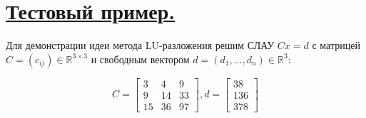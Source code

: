 \documentclass[a4paper, 12pt]{article}
\begin{document}
	\section{\underline{Тестовый пример.}}
	
	Для демонстрации идеи метода LU-разложения решим СЛАУ $Cx=d$ с матрицей $C=(c_{ij})\in\mathbb{R}^{3\times3}$ и свободным вектором $d=(d_1,...,d_n)\in\mathbb{R}^3$:
	
	\begin{equation*}
		C=
		\begin{bmatrix}
			3 & 4 & 9 \\
			9 & 14 & 33 \\
			15 & 36 & 97
		\end{bmatrix},
		d=
		\begin{bmatrix}
			38 \\ 136 \\ 378
		\end{bmatrix}
	\end{equation*}
\end{document}

